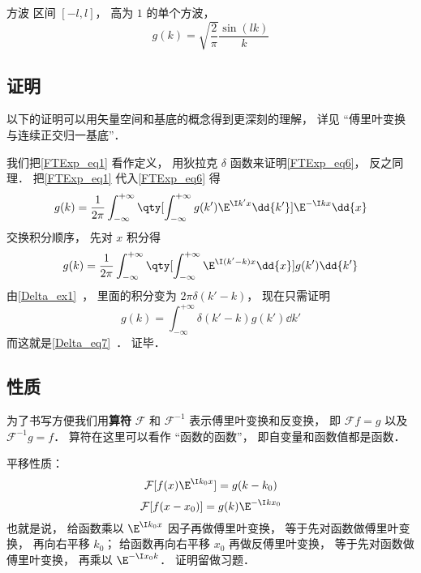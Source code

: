 \begin{example}{方波}
区间 $[-l,l]$， 高为 $1$ 的单个方波，
\begin{equation}
g(k) = \sqrt{\frac{2}{\pi}} \frac{\sin(lk)}{k}
\end{equation}
\end{example}

\subsection{证明}

以下的证明可以用矢量空间和基底的概念得到更深刻的理解， 详见 “傅里叶变换与连续正交归一基底”．

我们把\autoref{FTExp_eq1} 看作定义， 用狄拉克 $\delta$ 函数来证明\autoref{FTExp_eq6}， 反之同理． 把\autoref{FTExp_eq1} 代入\autoref{FTExp_eq6} 得
\begin{equation}
g(k) = \frac{1}{2\pi} \int_{-\infty}^{+\infty} \qty[ \int_{-\infty}^{+\infty} g(k') \E^{\I k' x} \dd{k'}] \E^{-\I k x} \dd{x}
\end{equation}
交换积分顺序， 先对 $x$ 积分得
\begin{equation}
g(k) = \frac{1}{2\pi} \int_{-\infty}^{+\infty} \qty[ \int_{-\infty}^{+\infty}  \E^{\I (k'-k) x} \dd{x}]  g(k')\dd{k'}
\end{equation}
由\autoref{Delta_ex1}~， 里面的积分变为 $2\pi\delta(k'-k)$， 现在只需证明
\begin{equation}
g(k) = \int_{-\infty}^{+\infty} \delta(k'-k)  g(k')\dd{k'}
\end{equation}
而这就是\autoref{Delta_eq7}~． 证毕．

\subsection{性质}
为了书写方便我们用\textbf{算符} $\mathcal F$ 和 $\mathcal F^{-1}$ 表示傅里叶变换和反变换， 即 $\mathcal F f = g$ 以及 $\mathcal F^{-1} g = f$． 算符在这里可以看作 “函数的函数”， 即自变量和函数值都是函数．

平移性质：
\begin{equation}\label{FTExp_eq4}
\mathcal F [f(x) \E^{\I k_0 x}] = g(k - k_0)
\end{equation}
\begin{equation}\label{FTExp_eq7}
\mathcal F[f(x - x_0)] = g(k) \E^{-\I k x_0}
\end{equation}
也就是说， 给函数乘以 $\E^{\I k_0 x}$ 因子再做傅里叶变换， 等于先对函数做傅里叶变换， 再向右平移 $k_0$； 给函数再向右平移 $x_0$ 再做反傅里叶变换， 等于先对函数做傅里叶变换， 再乘以 $\E^{-\I x_0 k}$． 证明留做习题．

